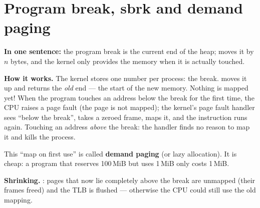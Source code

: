 \documentclass[11pt]{report}
\newcommand{\conceptsection}[1]{\section{#1}}
\begin{document}
\conceptsection{Program break, sbrk and demand paging}
\label{c:sbrk}

\textbf{In one sentence:} the program break is the current end of the heap;  moves
it by $n$ bytes, and the kernel only provides the memory when it is actually touched.

\textbf{How it works.} The kernel stores one number per process: the break. 
moves it up and returns the \emph{old} end --- the start of the new memory. Nothing is mapped yet!
When the program touches an address below the break for the first time, the CPU raises a page fault
(the page is not mapped); the kernel's page fault handler sees ``below the break'', takes a zeroed
frame, maps it, and the instruction runs again. Touching an address \emph{above} the break: the
handler finds no reason to map it and kills the process.

This ``map on first use'' is called \textbf{demand paging} (or lazy allocation). It is cheap: a
program that reserves 100\,MiB but uses 1\,MiB only costs 1\,MiB.

\textbf{Shrinking.} : pages that now lie completely above the break are unmapped
(their frames freed) and the TLB is flushed --- otherwise the CPU could still use the old mapping.
\end{document}
